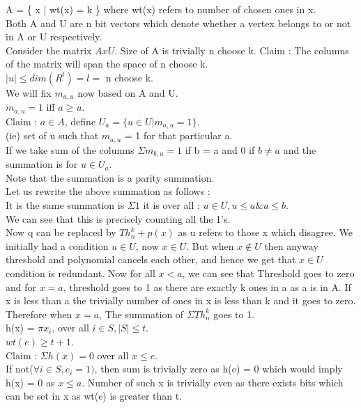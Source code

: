 \documentclass[solution,addpoints,12pt]{exam}
\begin{document}
A = \{ x | wt(x) = k \} where wt(x) refers to number of chosen ones in x.\\
Both A and U are n bit vectors which denote whether a vertex belongs to
or not in A or U respectively.\\
Consider the matrix $AxU$. Size of A is trivially n choose k.
Claim : The columns of the matrix will span the space of n choose k.\\
$|u| \le dim(R^l) = l = $ n choose k.\\
We will fix $m_{a, u}$ now based on A and U.\\
$m_{a, u} = 1$ iff $a \ge u$.\\
Claim : $a \in A$, define $U_a = \{u \in U | m_{a, u} = 1 \}$.\\
(ie) set of u such that $m_{a, u}$ = 1 for that particular a.\\
If we take sum of the columns $\Sigma m_{b, u} = 1$ if b = a and 0 if $b \ne a$
and the summation is for $u \in U_a$.\\
Note that the summation is a parity summation.\\
Let us rewrite the above summation as follows :\\
It is the same summation is $\Sigma 1$ it is over all : $u \in U, u \le a \& u \le b$.\\
We can see that this is precisely counting all the 1's.\\
Now q can be replaced by $Th_{n}^{k} + p(x)$ as u refers to those x which
disagree. We initially had a condition $u \in U$, now $x \in U$. But
when $x \not \in U$ then anyway threshold and polynomial cancels each other,
and hence we get that $x \in U$ condition is redundant. Now for all $x < a$,
we can see that Threshold goes to zero and for $x = a$, threshold goes to 1 as
there are exactly k ones in a as a is in A. If x is less than a the trivially
number of ones in x is less than k and it goes to zero.\\
Therefore when $x = a$, The summation of $\Sigma Th_{n}^{k}$ goes to 1.\\
h(x) = $\pi x_i$, over all $i \in S, |S| \le t$.\\
$wt(e) \ge t+1$.\\
Claim : $\Sigma h(x) = 0$ over all $x \le e$.\\
If not($\forall i \in S, e_i = 1)$, then sum is trivially zero as h(e) = 0
which would imply h(x) = 0 as $x \le a$. Number of such x is trivially even
as there exists bits which can be set in x as wt(e) is greater than t.\\
\end{document}

